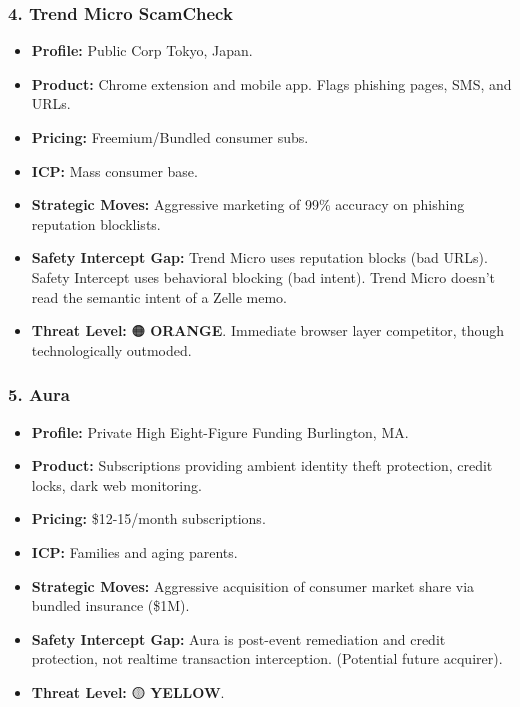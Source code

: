 \documentclass[
]{article}
\providecommand{\tightlist}{%
  \setlength{\itemsep}{0pt}\setlength{\parskip}{0pt}}
\begin{document}
\subsubsection{4. Trend Micro ScamCheck}\label{trend-micro-scamcheck}

\begin{itemize}
\tightlist
\item
  \textbf{Profile:} Public Corp \textbar{} Tokyo, Japan.
\item
  \textbf{Product:} Chrome extension and mobile app. Flags phishing
  pages, SMS, and URLs.
\item
  \textbf{Pricing:} Freemium/Bundled consumer subs.
\item
  \textbf{ICP:} Mass consumer base.
\item
  \textbf{Strategic Moves:} Aggressive marketing of 99\% accuracy on
  phishing reputation blocklists.
\item
  \textbf{Safety Intercept Gap:} Trend Micro uses reputation blocks (bad
  URLs). Safety Intercept uses behavioral blocking (bad intent). Trend
  Micro doesn't read the semantic intent of a Zelle memo.
\item
  \textbf{Threat Level:} 🟠 \textbf{ORANGE}. Immediate browser layer
  competitor, though technologically outmoded.
\end{itemize}

\subsubsection{5. Aura}\label{aura}

\begin{itemize}
\tightlist
\item
  \textbf{Profile:} Private \textbar{} High Eight-Figure Funding
  \textbar{} Burlington, MA.
\item
  \textbf{Product:} Subscriptions providing ambient identity theft
  protection, credit locks, dark web monitoring.
\item
  \textbf{Pricing:} \$12-15/month subscriptions.
\item
  \textbf{ICP:} Families and aging parents.
\item
  \textbf{Strategic Moves:} Aggressive acquisition of consumer market
  share via bundled insurance (\$1M).
\item
  \textbf{Safety Intercept Gap:} Aura is post-event remediation and
  credit protection, not realtime transaction interception. (Potential
  future acquirer).
\item
  \textbf{Threat Level:} 🟡 \textbf{YELLOW}.
\end{itemize}
\end{document}

